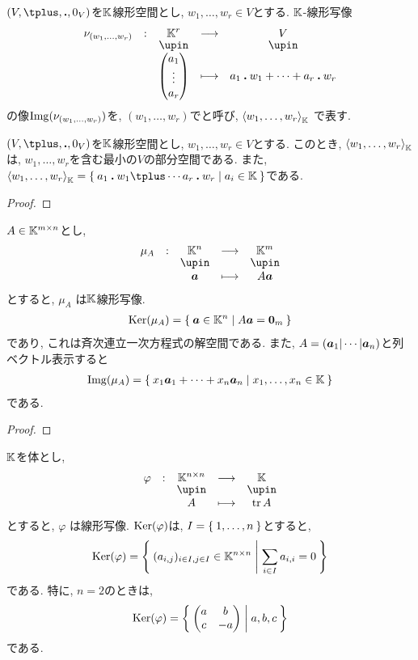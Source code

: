 \begin{definition}
  $(V,\plus,\act,0_V)$を$\mathbb{K}$線形空間とし,
  $w_1,\ldots,w_r\in V$とする.
  $\mathbb{K}$-線形写像
    \begin{align*}
      \shazo{\nu_{(w_1,\ldots,w_r)}}{\KK^r}{V}
      {\begin{pmatrix}a_1\\\vdots\\a_r\end{pmatrix}}{a_1\act w_1+\cdots+a_r\act w_r}
    \end{align*}
  の像$\operatorname{Img}(\nu_{(w_1,\ldots,w_r)})$を,
  $(w_1,\ldots,w_r)$でと呼び,
  $\Braket{w_1,\ldots,w_r}_{\mathbb{K}}$
  で表す.  
\end{definition}
\begin{remark}
  $(V,\plus,\act,0_V)$を$\mathbb{K}$線形空間とし,
  $w_1,\ldots,w_r\in V$とする.
  このとき,
  $\Braket{w_1,\ldots,w_r}_{\mathbb{K}}$
  は,
  $w_1,\ldots,w_r$を含む最小の$V$の部分空間である.
  また, 
  $\Braket{w_1,\ldots,w_r}_{\KK}=\Set{a_1\act w_1\plus\cdots a_r\act w_r|a_i\in\KK}$である.
\end{remark}
\begin{proof}\end{proof}

\begin{example}
  $A\in \mathbb{K}^{m\times n}$とし,
  \begin{align*}
    \shazo{\mu_A}{\KK^{n}}{\KK^{m}}
    {\aaa}{A\aaa}
  \end{align*}
  とすると, $\mu_A$
  は$\mathbb{K}$線形写像.
  \begin{align*}
    \operatorname{Ker}(\mu_A)=\Set{\boldsymbol{a}\in\mathbb{K}^n|A\boldsymbol{a}=\boldsymbol{0}_m}
  \end{align*}
  であり, これは斉次連立一次方程式の解空間である.
  また, $A=(\boldsymbol{a}_1|\cdots|\boldsymbol{a}_n)$と列ベクトル表示すると
  \begin{align*}
    \operatorname{Img}(\mu_A)=\Set{x_1\boldsymbol{a}_1+\cdots+x_n\boldsymbol{a}_n|x_1,\ldots,x_n\in \mathbb{K}}
  \end{align*}
  である.
\end{example}
\begin{proof}\end{proof}

\begin{example}
$\mathbb{K}$を体とし,  
  \begin{align*}
    \shazo{\varphi}{\KK^{n\times n}}{\KK}
    {A}{\tr A}
  \end{align*}
  とすると, $\varphi$
  は線形写像.
  $\operatorname{Ker}(\varphi)$は, $I=\Set{1,\dots,n}$とすると,
  \begin{align*}
    \operatorname{Ker}(\varphi)=
    \Set{(a_{i,j})_{i\in I,j\in I} \in\mathbb{K}^{n\times n}|\sum_{i\in I}a_{i,i}=0}
  \end{align*}
  である. 特に, $n=2$のときは,
  \begin{align*}
    \operatorname{Ker}(\varphi)=
    \Set{\begin{pmatrix}a&b\\c&-a\end{pmatrix}|a,b,c}
  \end{align*}
  である.
\end{example}

